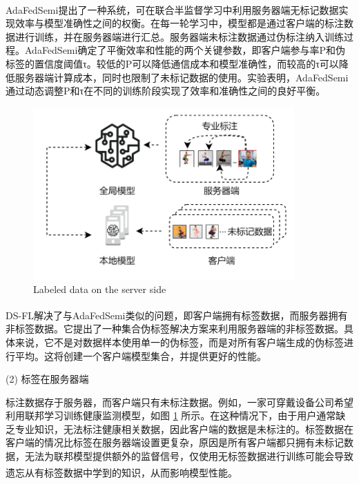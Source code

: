 AdaFedSemi\textsuperscript{\cite{wang2022enhancing}}提出了一种系统，可在联合半监督学习中利用服务器端无标记数据实现效率与模型准确性之间的权衡。在每一轮学习中，模型都是通过客户端的标注数据进行训练，并在服务器端进行汇总。服务器端未标注数据通过伪标注纳入训练过程。AdaFedSemi确定了平衡效率和性能的两个关键参数，即客户端参与率P和伪标签的置信度阈值τ。较低的P可以降低通信成本和模型准确性，而较高的τ可以降低服务器端计算成本，同时也限制了未标记数据的使用。实验表明，AdaFedSemi通过动态调整P和τ在不同的训练阶段实现了效率和准确性之间的良好平衡。

\vspace{-0.1cm}
\begin{figure}[!htbp]
	\centering
	\includegraphics[width=10cm]{chapters/imgs/LabelAtServer}
	{\wuhao Labeled data on the server side}
	\label{LabelAtServer}
\end{figure}
\vspace{-0.35cm}

DS-FL\textsuperscript{\cite{itahara2021distillation}}解决了与AdaFedSemi类似的问题，即客户端拥有标签数据，而服务器拥有非标签数据。它提出了一种集合伪标签解决方案来利用服务器端的非标签数据。具体来说，它不是对数据样本使用单一的伪标签，而是对所有客户端生成的伪标签进行平均。这将创建一个客户端模型集合，并提供更好的性能。

(2) 标签在服务器端

标注数据存于服务器，而客户端只有未标注数据。例如，一家可穿戴设备公司希望利用联邦学习训练健康监测模型，如图 \ref{LabelAtServer} 所示。在这种情况下，由于用户通常缺乏专业知识，无法标注健康相关数据，因此客户端的数据是未标注的。标签数据在客户端的情况比标签在服务器端设置更复杂，原因是所有客户端都只拥有未标记数据，无法为联邦模型提供额外的监督信号，仅使用无标签数据进行训练可能会导致遗忘从有标签数据中学到的知识，从而影响模型性能\textsuperscript{\cite{jeong2020federated,diao2022semifl}}。

